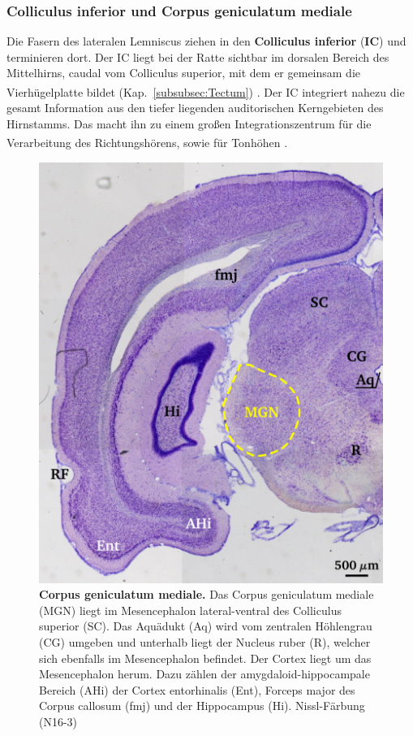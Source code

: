 \newpage
\subsubsection*{Colliculus inferior und Corpus geniculatum mediale}

Die Fasern des lateralen Lemniscus ziehen in den \textbf{Colliculus inferior} (\textbf{IC})  und terminieren dort. Der IC liegt bei der Ratte sichtbar im dorsalen Bereich des Mittelhirns, caudal vom Colliculus superior, mit dem er gemeinsam die Vierhügelplatte bildet (Kap.~\ref{subsubsec:Tectum}) \textsuperscript{\cite[Kap.~29]{paxinos2014rat}}. 
Der IC integriert nahezu die gesamt Information aus den tiefer liegenden auditorischen Kerngebieten des Hirnstamms. Das macht ihn zu einem großen Integrationszentrum für die Verarbeitung des Richtungshörens, sowie für Tonhöhen \textsuperscript{\cite[Kap.~29]{paxinos2014rat}}.

\begin{figure}[H]
    \centering
    \includegraphics{pictures/auditory/MG.png}
    \caption[Corpus geniculatum mediale]{\textbf{Corpus geniculatum mediale.} Das Corpus geniculatum mediale (MGN) liegt im Mesencephalon lateral-ventral des Colliculus superior (SC). Das Aquädukt (Aq) wird vom zentralen Höhlengrau (CG) umgeben und unterhalb liegt der Nucleus ruber (R), welcher sich ebenfalls im Mesencephalon befindet. Der Cortex liegt um das Mesencephalon herum. Dazu zählen der amygdaloid-hippocampale Bereich (AHi) der Cortex entorhinalis (Ent), Forceps major des Corpus callosum (fmj) und der Hippocampus (Hi). Nissl-Färbung (N16-3)}
    \label{fig:MG}
\end{figure}

